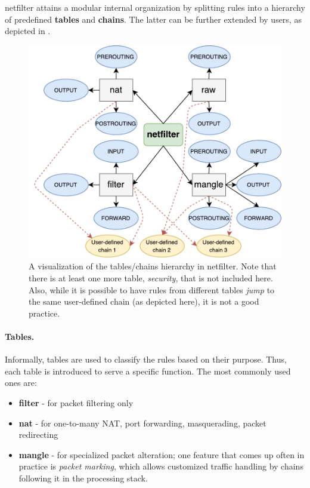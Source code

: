 netfilter attains a modular internal organization by splitting rules into a
hierarchy of predefined \textbf{tables} and \textbf{chains}.  The latter can be
further extended by users, as depicted in
.

\begin{figure}[h]
  \centering
  \captionsetup{justification=centering}
  \includegraphics[scale=0.6]{src/img/iptables-hierarchy}
  \caption[A visualization of the tables/chains hierarchy in netfilter.]{A
  visualization of the tables/chains hierarchy in netfilter. Note that there is
  at least one more table, \emph{security}, that is not included here. Also,
  while it is possible to have rules from different tables \emph{jump} to the
  same user-defined chain (as depicted here), it is not a good practice.}
  \label{fig:iptables-hierarchy}
\end{figure}

\paragraph{Tables.}
Informally, tables are used to classify the rules based on their purpose.
Thus, each table is introduced to serve a specific function.  The most commonly
used ones are:
\begin{itemize}
  \item \textbf{filter} - for packet filtering only
  \item \textbf{nat} - for one-to-many NAT, port forwarding, masquerading,
    packet redirecting
  \item \textbf{mangle} - for specialized packet alteration; one feature that
    comes up often in practice is \emph{packet marking}, which allows
    customized traffic handling by chains following it in the processing stack.
\end{itemize}

